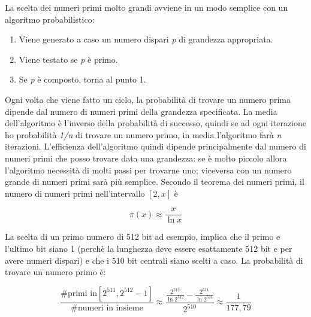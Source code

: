La scelta dei numeri primi molto grandi avviene in un modo semplice con un algoritmo probabilistico: 
\begin{enumerate}
    \item Viene generato a caso un numero dispari \textit{p} di grandezza appropriata.
    \item Viene testato se \textit{p} è primo.
    \item Se \textit{p} è composto, torna al punto 1.
\end{enumerate}
Ogni volta che viene fatto un ciclo, la probabilità di trovare un numero prima dipende dal numero di numeri primi della grandezza specificata. La media dell'algoritmo è l'inverso della probabilità di successo, quindi se ad ogni iterazione ho probabilità \textit{1/n} di trovare un numero primo, in media l'algoritmo farà \textit{n} iterazioni. L'efficienza dell'algoritmo quindi dipende principalmente dal numero di numeri primi che posso trovare data una grandezza: se è molto piccolo allora l'algoritmo necessità di molti passi per trovarne uno; viceversa con un numero grande di numeri primi sarà più semplice. Secondo il teorema dei numeri primi, il numero di numeri primi nell'intervallo $[2,x]$ è 

\[\pi (x) \approx \frac{x}{\ln x}\]

La scelta di un primo numero di 512 bit ad esempio, implica che il primo e l'ultimo bit siano 1 (perchè la lunghezza deve essere esattamente 512 bit e per avere numeri dispari) e che i 510 bit centrali siano scelti a caso. La probabilità di trovare un numero primo è:

\[\frac{\text{\#primi in}[2^{511},2^{512}-1]}{\text{\#numeri in insieme}} \approx \frac{\frac{2^{512}}{\ln 2^{512}} - \frac{2^{511}}{\ln 2^{511}}}{2^{510}} \approx \frac{1}{177,79}\]

